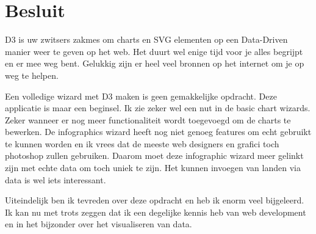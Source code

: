 \chapter{Besluit}
\label{chap_besluit}

D3 is uw zwitsers zakmes om charts en SVG elementen op een Data-Driven manier weer te geven op het web. Het duurt wel enige tijd voor je alles begrijpt en er mee weg bent. Gelukkig zijn er heel veel bronnen op het internet om je op weg te helpen.

Een volledige wizard met D3 maken is geen gemakkelijke opdracht. Deze applicatie is maar een beginsel. Ik zie zeker wel een nut in de basic chart wizards. Zeker wanneer er nog meer functionaliteit wordt toegevoegd om de charts te bewerken. De infographics wizard heeft nog niet genoeg features om echt gebruikt te kunnen worden en ik vrees dat de meeste web designers en grafici toch photoshop zullen gebruiken. Daarom moet deze infographic wizard meer gelinkt zijn met echte data om toch uniek te zijn. Het kunnen invoegen van landen via data is wel iets interessant. 

Uiteindelijk ben ik tevreden over deze opdracht en heb ik enorm veel bijgeleerd. Ik kan nu met trots zeggen dat ik een degelijke kennis heb van web development en in het bijzonder over het visualiseren van data.